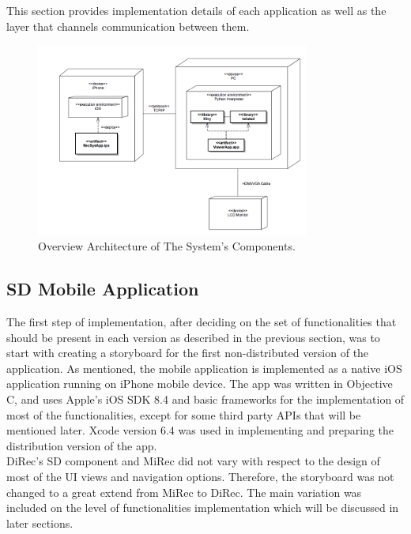 This section provides implementation details of each application as well as the layer that channels communication between them.    
\begin{figure}[h]
\includegraphics[width=0.8\textwidth, center, center]{figures/deployment}
\caption{Overview Architecture of The System's Components.}
\label{fig:figure41}
\end{figure}

\subsection{SD Mobile Application}
The first step of implementation, after deciding on the set of functionalities that should be present in each version as described in the previous section, was to start with creating a storyboard for the first non-distributed version of the application. As mentioned, the mobile application is implemented as a native iOS application running on iPhone mobile device. The app was written in Objective C, and uses Apple's iOS SDK 8.4 and basic frameworks for the implementation of most of the functionalities, except for some third party APIs that will be mentioned later. Xcode version 6.4 was used in implementing and preparing the distribution version of the app.\\
DiRec's SD component and MiRec did not vary with respect to the design of most
of the UI views and navigation options. Therefore, the
storyboard was not changed to a great extend from MiRec to DiRec. The main
variation was included on the level of functionalities implementation which will
be discussed in later sections.
  
